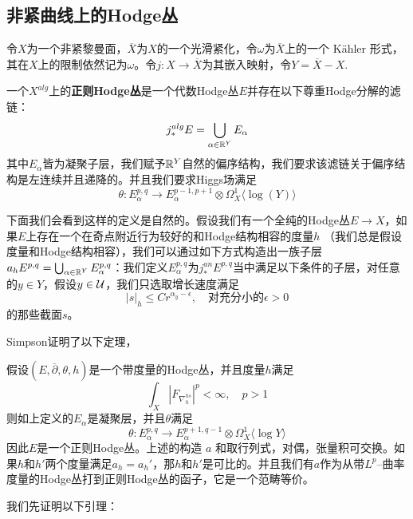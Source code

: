 \subsection{非紧曲线上的Hodge丛}
令$X$为一个非紧黎曼面，$\overline{X}$为$X$的一个光滑紧化，令$\omega$为$\overline{X}$上的一个 K\"ahler 形式，其在$X$上的限制依然记为$\omega$。令$j:X\to \overline{X}$为其嵌入映射，令$Y=\overline{X}-X$. 
\begin{definition}\label{regularsytemofhodgebundle}
    一个$X^{alg}$上的\textbf{正则Hodge丛}是一个代数Hodge丛$E$并存在以下尊重Hodge分解的滤链：
    \[
    j_*^{alg}E=\bigcup_{\alpha\in \mathbb{R}^{Y}} E_{\alpha}
    \]
其中$E_\alpha$皆为凝聚子层，我们赋予$\mathbb{R}^{Y}$自然的偏序结构，我们要求该滤链关于偏序结构是左连续并且递降的。并且我们要求Higgs场满足
\[
\theta: E^{p,q}_\alpha \to E^{p-1,p+1}_\alpha\otimes \Omega_X^1\langle\log(Y)\rangle
\]
\end{definition}
下面我们会看到这样的定义是自然的。假设我们有一个全纯的Hodge丛$E\to X$，如果$E$上存在一个在奇点附近行为较好的和Hodge结构相容的度量$h$ （我们总是假设度量和Hodge结构相容），我们可以通过如下方式构造出一族子层$a_hE^{p,q}=\bigcup_{\alpha\in \mathbb{R}^{Y}} E^{p,q}_\alpha$：我们定义$E^{p,q}_\alpha$为$j^{an}_*E^{p,q}$当中满足以下条件的子层，对任意的$y\in Y$，假设$y\in\mathcal{U}$，我们只选取增长速度满足
\[
|s|_h\leq C r^{\alpha_y-\epsilon},\quad \text{对充分小的}\epsilon>0
\]
的那些截面$s$。

Simpson\cite{Si1}证明了以下定理，
\begin{theorem}
    假设$(E,\overline{\partial},\theta, h)$是一个带度量的Hodge丛，并且度量$h$满足
    \[
    \int_X |F_{\nabla^{hs}_h}|^p <\infty,\quad p>1
    \]
    则如上定义的$E_\alpha$是凝聚层，并且$\theta$满足
    \[
    \theta: E^{p,q}_\alpha \to E^{p+1,q-1}_\alpha \otimes \Omega_X^1\langle\log Y\rangle
    \]
    因此$E$是一个正则Hodge丛。上述的构造 $a$ 和取行列式，对偶，张量积可交换。如果$h$和$h'$两个度量满足$a_h=a_h'$，那$h$和$h'$是可比的。并且我们有$a$作为从带$L^p$--曲率度量的Hodge丛打到正则Hodge丛的函子，它是一个范畴等价。
\end{theorem}

我们先证明以下引理：

